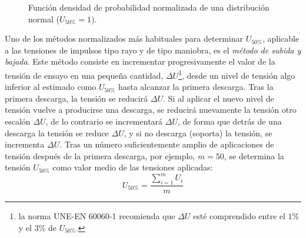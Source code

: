         \begin{figure}[H]
            \centering
            \caption{Función densidad de probabilidad normalizada de una distribución normal ($U_{50\!\text{\%}}=1$).}
            \label{fig:distNormal}
        \end{figure}

        Uno de los métodos normalizados más habituales para determinar $U_{50\!\text{\%}}$, aplicable a las tensiones de impulsos tipo rayo y de tipo maniobra, es el \textit{método de subida y bajada}. Este método consiste en incrementar progresivamente el valor de la tensión de ensayo en una pequeña cantidad, $\Delta U$\footnote{la norma UNE-EN 60060-1 recomienda que $\Delta U$ esté comprendido entre el $1\!$\% y el $3\!$\% de $U_{50\!\text{\%}}$.}, desde un nivel de tensión algo inferior al estimado como $U_{50\!\text{\%}}$ hasta alcanzar la primera descarga. Tras la primera descarga, la tensión se reducirá $\Delta U$. Si al aplicar el nuevo nivel de tensión vuelve a producirse una descarga, se reducirá nuevamente la tensión otro escalón $\Delta U$, de lo contrario se incrementará $\Delta U$, de forma que detrás de una descarga la tensión se reduce $\Delta U$, y si no descarga (soporta) la tensión, se incrementa $\Delta U$. Tras un número suficientemente amplio de aplicaciones de tensión después de la primera descarga, por ejemplo, $m=50$, se determina la tensión $U_{50\!\text{\%}}$ como valor medio de las tensiones aplicadas:
        \begin{equation}
            U_{50\!\text{\%}} = \dfrac{\sum\limits_{i=1}^m U_i}{m}
        \end{equation}
        

